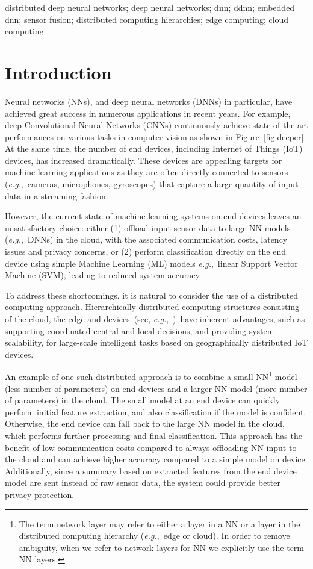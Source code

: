 \documentclass[10pt, conference, compsocconf]{IEEEtran}
\newcommand{\eg}{\emph{e.g.}}
\begin{document}
\begin{IEEEkeywords}
distributed deep neural networks; deep neural networks; dnn; ddnn; embedded dnn; sensor fusion; distributed computing hierarchies; edge computing; cloud computing
\end{IEEEkeywords}

\IEEEpeerreviewmaketitle

\section{Introduction}
Neural networks (NNs), and deep neural networks (DNNs) in particular, have achieved great success in numerous applications in recent years. For example, deep Convolutional Neural Networks (CNNs) continuously achieve state-of-the-art performances on various tasks in computer vision as shown in Figure~\ref{fig:deeper}. At the same time, the number of end devices, including Internet of Things (IoT) devices, has increased dramatically. These devices are appealing targets for machine learning applications as they are often directly connected to sensors (\eg,~cameras, microphones, gyroscopes) that capture a large quantity of input data in a streaming fashion.

However, the current state of machine learning systems on end devices leaves an unsatisfactory choice: either (1) offload input sensor data to large NN models (\eg,~DNNs) in the cloud, with the associated communication costs, latency issues and privacy concerns, or (2) perform classification directly on the end device using simple Machine Learning (ML) models \eg,~linear Support Vector Machine (SVM), leading to reduced system accuracy.

To address these shortcomings, it is natural to consider the use of a distributed computing approach. Hierarchically distributed computing structures consisting of the cloud, the edge and devices~(see, \eg,~\cite{shiedge, skala2015scalable})~have inherent advantages, such as supporting coordinated central and local decisions, and providing system scalability, for large-scale intelligent tasks based on geographically distributed IoT devices. 

An example of one such distributed approach is to combine a small NN\footnote{The term network layer may refer to either a layer in a NN or a layer in the distributed computing hierarchy (\eg,~edge or cloud). In order to remove ambiguity, when we refer to network layers for NN we explicitly use the term NN layers.} model (less number of parameters) on end devices and a larger NN model (more number of parameters) in the cloud. The small model at an end device can quickly perform initial feature extraction, and also classification if the model is confident. Otherwise, the end device can fall back to the large NN model in the cloud, which performs further processing and final classification. This approach has the benefit of low communication costs compared to always offloading NN input to the cloud and can achieve higher accuracy compared to a simple model on device. Additionally, since a summary based on extracted features from the end device model are sent instead of raw sensor data, the system could provide better privacy protection.
\end{document}
